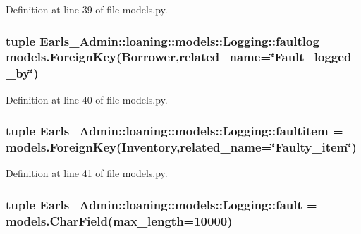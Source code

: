 Definition at line 39 of file models.py.\hypertarget{classEarls__Admin_1_1loaning_1_1models_1_1Logging_a46ce33fe9c2910c39ddf8678dc3de47}{
\subsubsection[faultlog]{\setlength{\rightskip}{0pt plus 5cm}tuple {\bf Earls\_\-Admin::loaning::models::Logging::faultlog} = models.ForeignKey({\bf Borrower},related\_\-name=\char`\"{}Fault\_\-logged\_\-by\char`\"{})}}
\label{classEarls__Admin_1_1loaning_1_1models_1_1Logging_a46ce33fe9c2910c39ddf8678dc3de47}




Definition at line 40 of file models.py.\hypertarget{classEarls__Admin_1_1loaning_1_1models_1_1Logging_3cef9eed464e6e3556ed1baac8930440}{
\subsubsection[faultitem]{\setlength{\rightskip}{0pt plus 5cm}tuple {\bf Earls\_\-Admin::loaning::models::Logging::faultitem} = models.ForeignKey({\bf Inventory},related\_\-name=\char`\"{}Faulty\_\-item\char`\"{})}}
\label{classEarls__Admin_1_1loaning_1_1models_1_1Logging_3cef9eed464e6e3556ed1baac8930440}




Definition at line 41 of file models.py.\hypertarget{classEarls__Admin_1_1loaning_1_1models_1_1Logging_eaa026062e1feffc8ded9ba05734c88d}{
\subsubsection[fault]{\setlength{\rightskip}{0pt plus 5cm}tuple {\bf Earls\_\-Admin::loaning::models::Logging::fault} = models.CharField(max\_\-length=10000)}}
\label{classEarls__Admin_1_1loaning_1_1models_1_1Logging_eaa026062e1feffc8ded9ba05734c88d}




